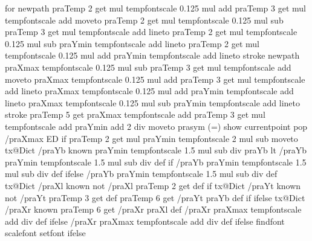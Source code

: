 {{{{{         } for
          newpath
          praTemp 2 get \pst@number\psxunit\space mul tempfontscale 0.125 mul add
          praTemp 3 get \pst@number\psyunit\space mul tempfontscale add moveto
          praTemp 2 get \pst@number\psxunit\space mul tempfontscale 0.125 mul sub
          praTemp 3 get \pst@number\psyunit\space mul tempfontscale add lineto
          praTemp 2 get \pst@number\psxunit\space mul tempfontscale 0.125 mul sub
          praYmin tempfontscale add lineto
          praTemp 2 get \pst@number\psxunit\space mul tempfontscale 0.125 mul add
          praYmin tempfontscale add lineto
          stroke
          newpath
          praXmax tempfontscale 0.125 mul sub
          praTemp 3 get \pst@number\psyunit\space mul tempfontscale add moveto
          praXmax tempfontscale 0.125 mul add
          praTemp 3 get \pst@number\psyunit\space mul tempfontscale add lineto
          praXmax tempfontscale 0.125 mul add
          praYmin tempfontscale add lineto
          praXmax tempfontscale 0.125 mul sub
          praYmin tempfontscale add lineto
          stroke
          praTemp 5 get {
          praXmax tempfontscale add
          praTemp 3 get \pst@number\psyunit\space mul tempfontscale add praYmin add 2 div moveto
          prasym (=) show currentpoint pop /praXmax ED} if
         praTemp 2 get \pst@number\psxunit\space mul praYmin tempfontscale 2 mul sub moveto %
         tx@Dict /praYb known {
         praYmin tempfontscale 1.5 mul sub \pst@number\psyunit\space div praYb lt {
         /praYb praYmin tempfontscale 1.5 mul sub \pst@number\psyunit\space div def } if }
         { /praYb praYmin tempfontscale 1.5 mul sub \pst@number\psyunit\space div def } ifelse
         /praYb praYmin tempfontscale 1.5 mul sub \pst@number\psyunit\space div def
         tx@Dict /praXl known not {/praXl praTemp 2 get def } if
         tx@Dict /praYt known not {/praYt praTemp 3 get def }
         { praTemp 6 get {/praYt praYb def} if } ifelse
         tx@Dict /praXr known {
         praTemp 6 get { /praXr praXl def }{ /praXr praXmax tempfontscale add \pst@number\psxunit\space div def } ifelse }{%
         /praXr praXmax tempfontscale add \pst@number\psxunit\space div def } ifelse
         \psk@PSfont\space findfont \psk@fontscale\space scalefont setfont } ifelse
}}}
